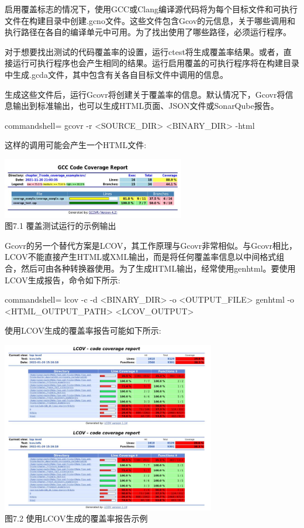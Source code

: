 启用覆盖标志的情况下，使用GCC或Clang编译源代码将为每个目标文件和可执行文件在构建目录中创建.gcno文件。这些文件包含Gcov的元信息，关于哪些调用和执行路径在各自的编译单元中可用。为了找出使用了哪些路径，必须运行程序。

对于想要找出测试的代码覆盖率的设置，运行ctest将生成覆盖率结果。或者，直接运行可执行程序也会产生相同的结果。运行启用覆盖的可执行程序将在构建目录中生成.gcda文件，其中包含有关各自目标文件中调用的信息。

生成这些文件后，运行Gcovr将创建关于覆盖率的信息。默认情况下，Gcovr将信息输出到标准输出，也可以生成HTML页面、JSON文件或SonarQube报告。

\begin{tcblisting}{commandshell={}}
gcovr -r <SOURCE_DIR> <BINARY_DIR> -html
\end{tcblisting}

这样的调用可能会产生一个HTML文件:

\begin{center}
\includegraphics[width=0.6\textwidth]{content/2/chapter7/images/1.jpg}\\
图7.1 覆盖测试运行的示例输出
\end{center}

Gcovr的另一个替代方案是LCOV，其工作原理与Gcovr非常相似。与Gcovr相比，LCOV不能直接产生HTML或XML输出，而是将任何覆盖率信息以中间格式组合，然后可由各种转换器使用。为了生成HTML输出，经常使用genhtml。要使用LCOV生成报告，命令如下所示:

\begin{tcblisting}{commandshell={}}
lcov -c -d <BINARY_DIR> -o <OUTPUT_FILE>
genhtml -o <HTML_OUTPUT_PATH> <LCOV_OUTPUT>
\end{tcblisting}

使用LCOV生成的覆盖率报告可能如下所示:

\begin{center}
\includegraphics[width=0.7\textwidth]{content/2/chapter7/images/2.jpg}\\
图7.2 使用LCOV生成的覆盖率报告示例
\end{center}

